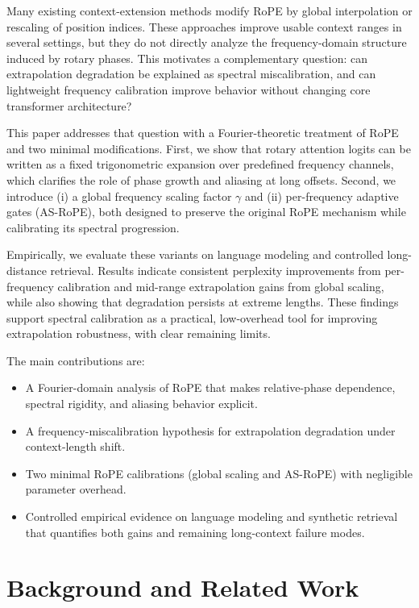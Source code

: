 \documentclass[conference]{IEEEtran}
\begin{document}
Many existing context-extension methods modify RoPE by global interpolation or rescaling of position indices. These approaches improve usable context ranges in several settings, but they do not directly analyze the frequency-domain structure induced by rotary phases. This motivates a complementary question: can extrapolation degradation be explained as spectral miscalibration, and can lightweight frequency calibration improve behavior without changing core transformer architecture?

This paper addresses that question with a Fourier-theoretic treatment of RoPE and two minimal modifications. First, we show that rotary attention logits can be written as a fixed trigonometric expansion over predefined frequency channels, which clarifies the role of phase growth and aliasing at long offsets. Second, we introduce (i) a global frequency scaling factor $\gamma$ and (ii) per-frequency adaptive gates (AS-RoPE), both designed to preserve the original RoPE mechanism while calibrating its spectral progression.

Empirically, we evaluate these variants on language modeling and controlled long-distance retrieval. Results indicate consistent perplexity improvements from per-frequency calibration and mid-range extrapolation gains from global scaling, while also showing that degradation persists at extreme lengths. These findings support spectral calibration as a practical, low-overhead tool for improving extrapolation robustness, with clear remaining limits.

The main contributions are:
\begin{itemize}
\item A Fourier-domain analysis of RoPE that makes relative-phase dependence, spectral rigidity, and aliasing behavior explicit.
\item A frequency-miscalibration hypothesis for extrapolation degradation under context-length shift.
\item Two minimal RoPE calibrations (global scaling and AS-RoPE) with negligible parameter overhead.
\item Controlled empirical evidence on language modeling and synthetic retrieval that quantifies both gains and remaining long-context failure modes.
\end{itemize}

\section{Background and Related Work}
\end{document}
